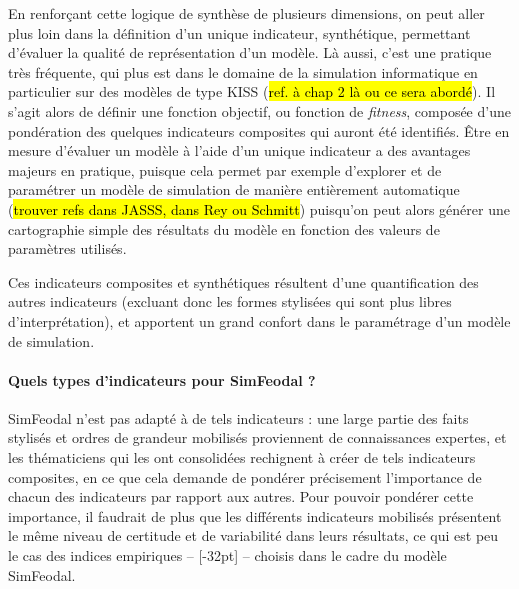 En renforçant cette logique de synthèse de plusieurs dimensions, on peut aller plus loin dans la définition d'un unique indicateur, synthétique, permettant d'évaluer la qualité de représentation d'un modèle.
Là aussi, c'est une pratique très fréquente, qui plus est dans le domaine de la simulation informatique en particulier sur des modèles de type \og KISS\fg{} (\hl{ref. à chap 2 là ou ce sera abordé}).
Il s'agit alors de définir une \og fonction objectif\fg{}, ou \og fonction de \textit{fitness}\fg{}, composée d'une pondération des quelques indicateurs composites qui auront été identifiés.
Être en mesure d'évaluer un modèle à l'aide d'un unique indicateur a des avantages majeurs en pratique, puisque cela permet par exemple d'explorer et de paramétrer un modèle de simulation de manière entièrement automatique (\hl{trouver refs dans JASSS, dans Rey ou Schmitt}) puisqu'on peut alors générer une cartographie simple des résultats du modèle en fonction des valeurs de paramètres utilisés.

Ces indicateurs composites et synthétiques résultent d'une quantification des autres indicateurs (excluant donc les formes stylisées qui sont plus libres d'interprétation), et apportent un grand confort dans le paramétrage d'un modèle de simulation.

\paragraph{Quels types d'indicateurs pour SimFeodal ?}

SimFeodal n'est pas adapté à de tels indicateurs :
une large partie des faits stylisés et ordres de grandeur mobilisés proviennent de connaissances expertes, et les thématiciens qui les ont consolidées rechignent à créer de tels indicateurs composites, en ce que cela demande de pondérer précisement l'importance de chacun des indicateurs par rapport aux autres.
Pour pouvoir pondérer cette importance, il faudrait de plus que les différents indicateurs mobilisés présentent le même niveau de certitude et de variabilité dans leurs résultats, ce qui est peu le cas des indices empiriques -- [-32pt] -- choisis dans le cadre du modèle SimFeodal.

